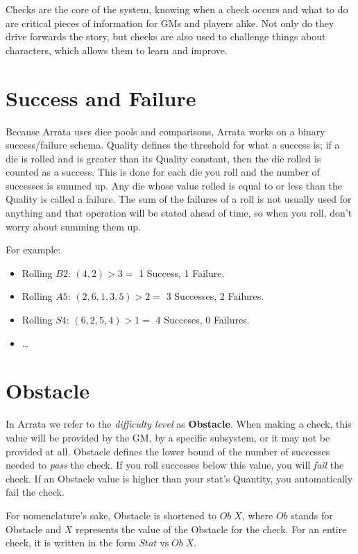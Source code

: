 \documentclass[../main.tex]{subfiles}
\begin{document}
    Checks are the core of the system, knowing when a check occurs and what to do are critical pieces of information for GMs and players alike. Not only do they drive forwards the story, but checks are also used to challenge things about characters, which allows them to learn and improve.

    \section{Success and Failure}

    Because Arrata uses dice pools and comparisons, Arrata works on a binary success/failure schema. Quality defines the threshold for what a success is; if a die is rolled and is greater than its Quality constant, then the die rolled is counted as a success. This is done for each die you roll and the number of successes is summed up. Any die whose value rolled is equal to or less than the Quality is called a failure. The sum of the failures of a roll is not usually used for anything and that operation will be stated ahead of time, so when you roll, don't worry about summing them up.

    For example:

    \begin{itemize}
        \item Rolling $B2$: $(4, 2)>3 =$ 1 Success, 1 Failure.
        \item Rolling $A5$: $(2, 6, 1, 3, 5)>2 =$ 3 Successes, 2 Failures.
        \item Rolling $S4$: $(6, 2, 5, 4)>1 =$ 4 Succeses, 0 Failures.
        \item \dots
    \end{itemize}

    \section{Obstacle}

    In Arrata we refer to the {\em difficulty level} as \textbf{Obstacle}. When making a check, this value will be provided by the GM, by a specific subsystem, or it may not be provided at all. Obstacle defines the lower bound of the number of successes needed to {\em pass} the check. If you roll successes below this value, you will {\em fail} the check. If an Obstacle value is higher than your stat's Quantity, you automatically fail the check.

    For nomenclature's sake, Obstacle is shortened to $Ob\; X$, where $Ob$ stands for Obstacle and $X$ represents the value of the Obstacle for the check. For an entire check, it is written in the form $Stat\mathrm{\; vs \;}Ob\; X$.
\end{document}
